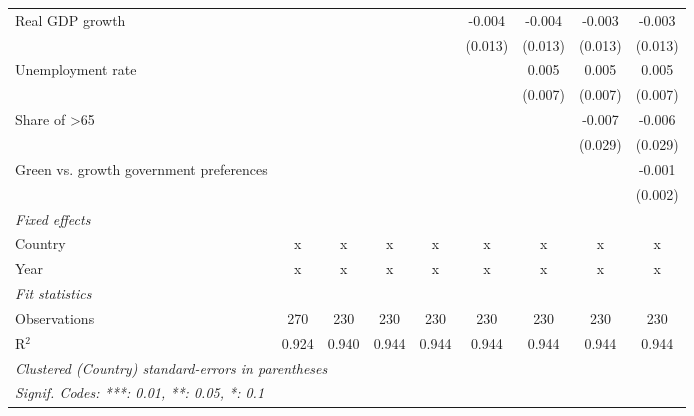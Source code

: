 \begin{table}[htbp]
\begin{tabular}{lcccccccc}
      Real GDP growth                                                  &         &         &               &               & -0.004        & -0.004         & -0.003         & -0.003\\   
                                                                       &         &         &               &               & (0.013)       & (0.013)        & (0.013)        & (0.013)\\   
      Unemployment rate                                                &         &         &               &               &               & 0.005          & 0.005          & 0.005\\   
                                                                       &         &         &               &               &               & (0.007)        & (0.007)        & (0.007)\\   
      Share of >65                                                     &         &         &               &               &               &                & -0.007         & -0.006\\   
                                                                       &         &         &               &               &               &                & (0.029)        & (0.029)\\   
      Green vs. growth government preferences                          &         &         &               &               &               &                &                & -0.001\\   
                                                                       &         &         &               &               &               &                &                & (0.002)\\   
      \emph{Fixed effects}\\
      Country                                                          & x       & x       & x             & x             & x             & x              & x              & x\\  
      Year                                                             & x       & x       & x             & x             & x             & x              & x              & x\\  
      \midrule \emph{Fit statistics}\\
      Observations                                                     & 270     & 230     & 230           & 230           & 230           & 230            & 230            & 230\\  
      R$^2$                                                            & 0.924   & 0.940   & 0.944         & 0.944         & 0.944         & 0.944          & 0.944          & 0.944\\  
      \midrule
      \multicolumn{9}{l}{\emph{Clustered (Country) standard-errors in parentheses}}\\
      \multicolumn{9}{l}{\emph{Signif. Codes: ***: 0.01, **: 0.05, *: 0.1}}\\
   \end{tabular}
\end{table}


